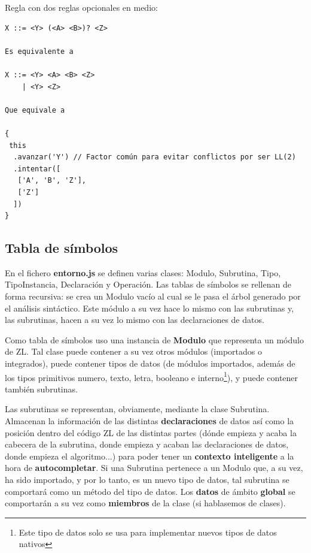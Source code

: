 \documentclass{report}
\begin{document}
	Regla con dos reglas opcionales en medio:
	
	\begin{BVerbatim}
X ::= <Y> (<A> <B>)? <Z>

Es equivalente a

X ::= <Y> <A> <B> <Z>
    | <Y> <Z>
    
Que equivale a

{
 this
  .avanzar('Y') // Factor común para evitar conflictos por ser LL(2)
  .intentar([
   ['A', 'B', 'Z'],
   ['Z']
  ])
}
	\end{BVerbatim}
	
	\subsection{Tabla de símbolos}
	
	En el fichero \textbf{entorno.js} se definen varias clases: Modulo, Subrutina, Tipo, TipoInstancia, Declaración y Operación. Las tablas de símbolos se rellenan de forma recursiva: se crea un Modulo vacío al cual se le pasa el árbol generado por el análisis sintáctico. Este módulo a su vez hace lo mismo con las subrutinas y, las subrutinas, hacen a su vez lo mismo con las declaraciones de datos.
	
	\vspace{10px}
	
	Como tabla de símbolos uso una instancia de \textbf{Modulo} que representa un módulo de ZL. Tal clase puede contener a su vez otros módulos (importados o integrados), puede contener tipos de datos (de módulos importados, además de los tipos primitivos numero, texto, letra, booleano e interno\footnote{Este tipo de datos solo se usa para implementar nuevos tipos de datos nativos}), y puede contener también subrutinas.
	
	\vspace{10px}
	
	Las subrutinas se representan, obviamente, mediante la clase Subrutina. Almacenan la información de las distintas \textbf{declaraciones} de datos así como la posición dentro del código ZL de las distintas partes (dónde empieza y acaba la cabecera de la subrutina, donde empieza y acaban las declaraciones de datos, donde empieza el algoritmo...) para poder tener un \textbf{contexto inteligente} a la hora de \textbf{autocompletar}. Si una Subrutina pertenece a un Modulo que, a su vez, ha sido importado, y por lo tanto, es un nuevo tipo de datos, tal subrutina se comportará como un método del tipo de datos. Los \textbf{datos} de ámbito \textbf{global} se comportarán a su vez como \textbf{miembros} de la clase (si hablasemos de clases). 
	
\end{document}

